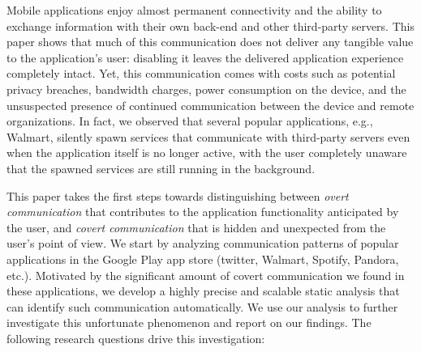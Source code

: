 Mobile applications enjoy almost permanent connectivity and the
ability to exchange information with their own back-end and other
third-party servers.  This paper shows that much of this communication
does not deliver any tangible value to the application's user: 
disabling it leaves the delivered application experience completely
intact.  Yet, this communication comes with costs such as 
potential privacy breaches,
bandwidth charges, power consumption on the device,  
and the unsuspected presence of continued
communication between the device and remote organizations. In fact, we
observed that several popular applications, e.g., Walmart, silently spawn services that
communicate with third-party servers even when the application itself
is no longer active, with the user completely unaware that the spawned
services are still running in the background. 


This paper takes the first steps towards distinguishing between 
\emph{overt communication} that contributes to the application functionality anticipated by the user, and
\emph{covert communication} that is hidden and unexpected from the user's point of view.
We start by
analyzing communication patterns of
popular applications in the Google Play app store (twitter, Walmart,
Spotify, Pandora, etc.). Motivated by the significant
amount of covert communication we found in these applications, 
we develop a highly precise and scalable static analysis that can identify 
such communication automatically. We use our analysis to further 
investigate this unfortunate phenomenon and report on our findings. 
The following research questions drive this investigation:

